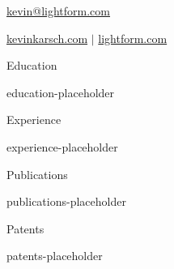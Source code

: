 


\geometry{top=1in, bottom=1in, left=1in, right=1in}

\hypersetup{colorlinks=true, allcolors=secondaryColor}



\centerline{}
\vspace{2pt}
\centerline{\href{mailto:kevin@lightform.com}{kevin@lightform.com}}
\vspace{2pt}
\centerline{\href{https://kevinkarsch.com}{kevinkarsch.com} $\vert$ \href{https://lightform.com}{lightform.com}}

\begin{cvSection}{Education}

{{education-placeholder}}

\end{cvSection}


\begin{cvSection}{Experience}

{{experience-placeholder}}

\end{cvSection}


\begin{cvSection}{Publications}

{{publications-placeholder}}

\end{cvSection}


\begin{cvSection}{Patents}

{{patents-placeholder}}

\end{cvSection}


